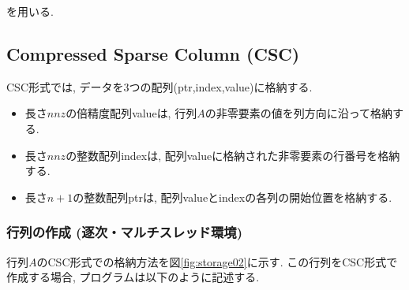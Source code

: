 \documentclass[a4paper]{jarticle}
\begin{document}
{{を用いる. 

\newpage
\subsection{Compressed Sparse Column (CSC)}
CSC形式では, データを3つの配列({\ttfamily ptr,index,value})に格納する. 
\begin{itemize}
\item 長さ$nnz$の倍精度配列{\ttfamily value}は, 行列$A$の非零要素の値を列方向に沿って格納する. 
\item 長さ$nnz$の整数配列{\ttfamily index}は, 配列{\ttfamily value}に格納された非零要素の行番号を格納する. 
\item 長さ$n+1$の整数配列{\ttfamily ptr}は, 配列{\ttfamily value}と{\ttfamily index}の各列の開始位置を格納する. 
\end{itemize}

\subsubsection{行列の作成 (逐次・マルチスレッド環境)}
行列$A$のCSC形式での格納方法を図\ref{fig:storage02}に示す. 
この行列をCSC形式で作成する場合, プログラムは以下のように記述する. 

}}
\end{document}
